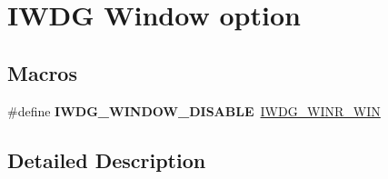 \hypertarget{group___i_w_d_g___window__option}{}\section{I\+W\+DG Window option}
\label{group___i_w_d_g___window__option}
\subsection*{Macros}
\begin{DoxyCompactItemize}
\item 
\mbox{\label{group___i_w_d_g___window__option_gacb0cd4c52a61d2e0e6e5f8fb910fe60b}} 
\#define {\bfseries I\+W\+D\+G\+\_\+\+W\+I\+N\+D\+O\+W\+\_\+\+D\+I\+S\+A\+B\+LE}~\hyperlink{group___peripheral___registers___bits___definition_ga9a609548fc74e1d2214de4413081e03d}{I\+W\+D\+G\+\_\+\+W\+I\+N\+R\+\_\+\+W\+IN}
\end{DoxyCompactItemize}


\subsection{Detailed Description}
